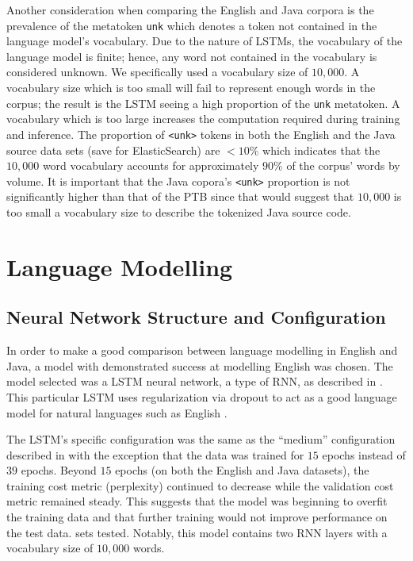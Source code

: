 \documentclass{article}
\begin{document}
Another consideration when comparing the English and Java corpora is the
prevalence of the metatoken \texttt{unk} which denotes a token not contained
in the language model's vocabulary.
Due to the nature of LSTMs, the vocabulary of the language model is finite;
hence, any word not contained in the vocabulary is considered unknown.
We specifically used a vocabulary size of $10,000$. A vocabulary size which
is too small will fail to represent enough words in the corpus; the result
is the LSTM seeing a high proportion of the \texttt{unk} metatoken. A
vocabulary which is too large increases the computation required during
training and inference.
The proportion of \texttt{<unk>} tokens in both the English and the Java
source data sets (save for ElasticSearch) are $<10\%$ which indicates that
the $10,000$ word vocabulary accounts for approximately $90\%$ of the corpus'
words by volume. It is important that the Java copora's \texttt{<unk>}
proportion is not significantly higher than that of the PTB since
that would suggest that $10,000$ is too small a vocabulary size to describe
the tokenized Java source code.

\section{Language Modelling}
\label{language-modelling}

\subsection{Neural Network Structure and Configuration}

In order to make a good comparison between language modelling in English
and Java, a model with demonstrated success at modelling English was
chosen. The model selected was a LSTM neural
network, a type of RNN, as described in
\citet{LSTMArticle}. This particular LSTM uses regularization via 
dropout to act as a good language model for natural languages
such as English \cite{LSTMArticle}.


The LSTM's specific configuration was the same as the ``medium''
configuration described in \citet{LSTMArticle} with the exception
that the data was trained for $15$ epochs instead of $39$ epochs.
Beyond $15$ epochs (on both the English and Java datasets), the 
training cost metric (perplexity) continued to decrease while the
validation cost metric remained steady. This suggests that the model
was beginning to overfit the training data and that further training
would not improve performance on the test data.
sets tested. Notably, this model contains two RNN layers with a vocabulary
size of $10,000$ words.
\end{document}
